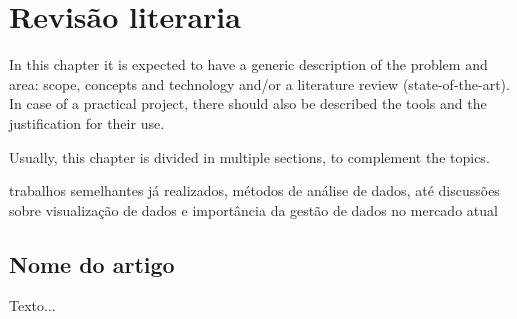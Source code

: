 


\chapter{Revisão literaria }\label{cap:conceptual}

In this chapter it is expected to have a generic description of the problem and area: scope, concepts and technology and/or a literature review (state-of-the-art). In case of a practical project, there should also be described the tools and the justification for their use.

Usually, this chapter is divided in multiple sections, to complement the topics.

trabalhos semelhantes já realizados, métodos de análise de dados, até discussões sobre visualização de dados e importância da gestão de dados no mercado atual


\section[Nome do artigo]{Nome do artigo}

Texto...